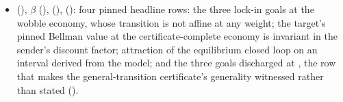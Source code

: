 \begin{itemize}[leftmargin=1.4em,itemsep=1pt]
\item {} (), $\beta$ (),  (),  (): four pinned headline rows: the three lock-in goals at the wobble economy, whose transition is not affine at any weight; the target's pinned Bellman value at the certificate-complete economy is invariant in the sender's discount factor; attraction of the equilibrium closed loop on an interval derived from the model; and the three goals discharged at , the row that makes the general-transition certificate's generality witnessed rather than stated ().
\end{itemize}

